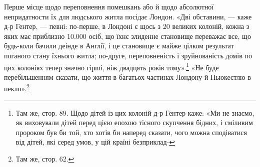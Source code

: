 Перше місце щодо переповнення помешкань або й щодо абсолютної
непридатности їх для людського житла посідає Лондон.
«Дві обставини, — каже д-р Гентер, — певні: по-перше, в Лондоні
є щось з 20 великих колоній, кожна з яких має приблизно
10.000  осіб, що їхнє злиденне становище переважає все, що будь-коли
бачили деінде в Англії, і це становище є майже цілком результат
поганого стану їхнього житла; по-друге, переповненість і зруйнованість
домів по цих колоніях тепер значно гірші, ніж двадцять
років тому».\footnote{
Там же, стор. 89. Щодо дітей із цих колоній д-р Гентер каже:
«Ми не знаємо, як виховували дітей перед цією епохою тісного скупчення
бідних, і сміливим пророком був би той, хто хотів би наперед сказати,
чого можна сподіватися від дітей, які серед умов, у цій країні безприклад-
} «Не буде перебільшенням сказати, що
життя в багатьох частинах Лондону й Ньюкестлю в пекло».\footnote{
Там же, стор. 62.
}

